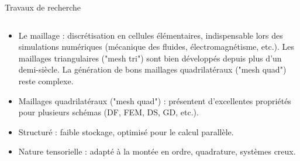 \documentclass[compress,10pt,aspectratio=169]{beamer}
\begin{document}
\begin{frame}{Travaux de recherche}
\small
\begin{columns}
    \begin{column}{0.8\textwidth}
    \vspace{-0.3cm}
\begin{itemize}
\item {\color{onera} Le maillage :} discrétisation en cellules élémentaires, indispensable lors des simulations numériques (mécanique des fluides, électromagnétisme, etc.). Les maillages triangulaires ("mesh tri") sont bien développés depuis plus d'un demi-siècle. La génération de bons maillages quadrilatéraux ("mesh quad") reste complexe.\\\vspace{0.25cm}

\item {\color{onera} Maillages quadrilatéraux ("mesh quad") :} présentent d'excellentes propriétés pour plusieurs schémas (DF, FEM, DS, GD, etc.).\\\vspace{0.2cm}

\item {\color{onera} Structuré :} faible stockage, optimisé pour le calcul parallèle.\\\vspace{0.2cm}

\item {\color{onera} Nature tensorielle :} adapté à la montée en ordre, quadrature, systèmes creux.\\\vspace{0.2cm}


\end{itemize}
\end{column}
\end{columns}
\end{frame}
\end{document}

